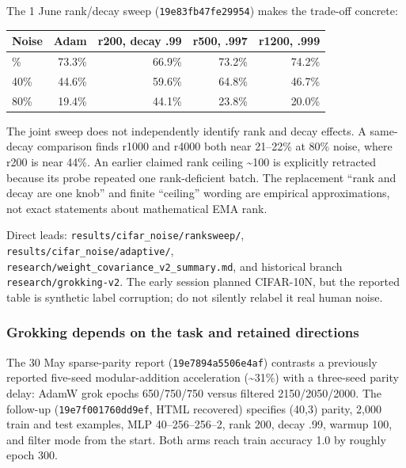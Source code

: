 \documentclass[
  british,
  10pt,
  a4paper,
]{article}
\newcounter{none} %
\begin{document}
The 1 June rank/decay sweep (\texttt{19e83fb47fe2\allowbreak{}9954})
makes the trade-off concrete:

{\def\LTcaptype{none} %
\begin{longtable}[]{@{}lrrrr@{}}
\toprule\noalign{}
Noise & Adam & r200, decay .99 & r500, .997 & r1200, .999 \\
\midrule\noalign{}
\endhead
\bottomrule\noalign{}
\endlastfoot
0\% & 73.3\% & 66.9\% & 73.2\% & 74.2\% \\
40\% & 44.6\% & 59.6\% & 64.8\% & 46.7\% \\
80\% & 19.4\% & 44.1\% & 23.8\% & 20.0\% \\
\end{longtable}
}

The joint sweep does not independently identify rank and decay effects.
A same-decay comparison finds r1000 and r4000 both near 21--22\% at 80\%
noise, where r200 is near 44\%. An earlier claimed rank ceiling
\textasciitilde100 is explicitly retracted because its probe repeated
one rank-\allowbreak{}deficient batch. The replacement ``rank and decay
are one knob'' and finite ``ceiling'' wording are empirical
approximatio\allowbreak{}ns,\allowbreak{} not exact statements about
mathematical EMA rank.

Direct leads:
\texttt{results/\allowbreak{}cifar\_\allowbreak{}noise/\allowbreak{}ranksweep/\allowbreak{}},
\texttt{results/\allowbreak{}cifar\_\allowbreak{}noise/\allowbreak{}adaptive/\allowbreak{}},
\texttt{research/\allowbreak{}weight\_\allowbreak{}covariance\_\allowbreak{}v2\_\allowbreak{}summary.\allowbreak{}md},
and historical branch
\texttt{research/\allowbreak{}grokking-\allowbreak{}v2}. The early
session planned CIFAR-10N, but the reported table is synthetic label
corruption; do not silently relabel it real human noise.

\subsubsection{Grokking depends on the task and retained
directions}\label{email-evidence--grokking-depends-on-the-task-and-retained-directions}

The 30 May sparse-\allowbreak{}parity report
(\texttt{19e7894a5506\allowbreak{}e4af}) contrasts a previously reported
five-seed modular-\allowbreak{}addition acceleration
(\textasciitilde31\%) with a three-seed parity delay: AdamW grok epochs
650/\allowbreak{}750/\allowbreak{}750 versus filtered
2150/\allowbreak{}2050/\allowbreak{}2000.\allowbreak{} The follow-up
(\texttt{19e7f001760d\allowbreak{}d9ef}, HTML recovered) specifies
(40,3) parity, 2,000 train and test examples, MLP
40–256–256–2\allowbreak{},\allowbreak{} rank 200, decay .99, warmup 100,
and filter mode from the start. Both arms reach train accuracy 1.0 by
roughly epoch 300.
\end{document}
